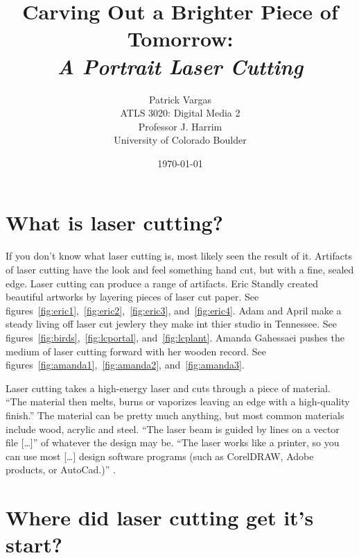 \documentclass[12pt singlecol]{article}
\begin{document}
\title{Carving Out a Brighter Piece of Tomorrow:\\\emph{A Portrait Laser Cutting}}
\author{Patrick Vargas\\ATLS 3020: Digital Media 2\\Professor J. Harrim\\University of Colorado Boulder}
\date{\today}

\thispagestyle{plain}
\maketitle

\begin{flushleft}

\setlength{\parindent}{0.5in}
\twocolumn
\section{What is laser cutting?}

If you don't know what laser cutting is, most likely seen the result of it. Artifacts of laser cutting have the look and feel something hand cut, but with a fine, sealed edge. Laser cutting can produce a range of artifacts. Eric Standly created beautiful artworks by layering pieces of laser cut paper. \cite{standley} See figures~\ref{fig:eric1},~\ref{fig:eric2},~\ref{fig:eric3}, and~\ref{fig:eric4}. Adam and April make a steady living off laser cut jewlery they make int thier studio in Tennessee. \cite{licketycut13} See figures~\ref{fig:birds},~\ref{fig:lcportal}, and~\ref{fig:lcplant}. Amanda Gahessaei pushes the medium of laser cutting forward with her wooden record. \cite{ghassaei13} See figures~\ref{fig:amanda1},~\ref{fig:amanda2}, and~\ref{fig:amanda3}. 

Laser cutting takes a high-energy laser and cuts through a piece of material. ``The material then melts, burns or vaporizes leaving an edge with a high-quality finish.'' \cite{Ponoko13} The material can be pretty much anything, but most common materials include wood, acrylic and steel. ``The laser beam is guided by lines on a vector file [\ldots]'' of whatever the design may be. \cite{Ponoko13} ``The laser works like a printer, so you can use most [\ldots] design software programs (such as CorelDRAW, Adobe products, or AutoCad.)'' \cite{Epilog09}.

\section{Where did laser cutting get it's start?}


\end{flushleft}
\end{document}
